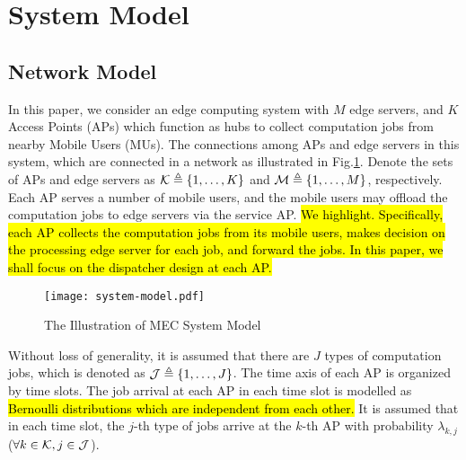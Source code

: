 \section{System Model}
\subsection{Network Model}
In this paper, we consider an edge computing system with $M$ edge servers, and $K$ Access Points (APs) which function as hubs to collect computation jobs from nearby Mobile Users (MUs).
The connections among APs and edge servers in this system, which are connected in a network as illustrated in Fig.\ref{fig:system}.
Denote the sets of APs and edge servers as $\mathcal{K} \triangleq \{1,\dots,K\}$ and $\mathcal{M} \triangleq \{1,\dots,M\}$, respectively.
Each AP serves a number of mobile users, and the mobile users may offload the computation jobs to edge servers via the service AP.
\hl{We highlight.
Specifically, each AP collects the computation jobs from its mobile users, makes decision on the processing edge server for each job, and forward the jobs. In this paper, we shall focus on the dispatcher design at each AP.}

\begin{figure}[ht]
    \centering
    \texttt{[image: system-model.pdf]}
    \caption{The Illustration of MEC System Model}
    \label{fig:system}
\end{figure}


Without loss of generality, it is assumed that there are $J$ types of computation jobs, which is denoted as $\mathcal{J} \triangleq \{1,\dots,J\}$.
The time axis of each AP is organized by time slots. The job arrival at each AP in each time slot is modelled as \hl{Bernoulli distributions which are independent from each other.}
It is assumed that in each time slot, the $j$-th type of jobs arrive at the $k$-th AP with probability $\lambda_{k,j}$ ($\forall k\in\mathcal{K}, j\in\mathcal{J}$).


